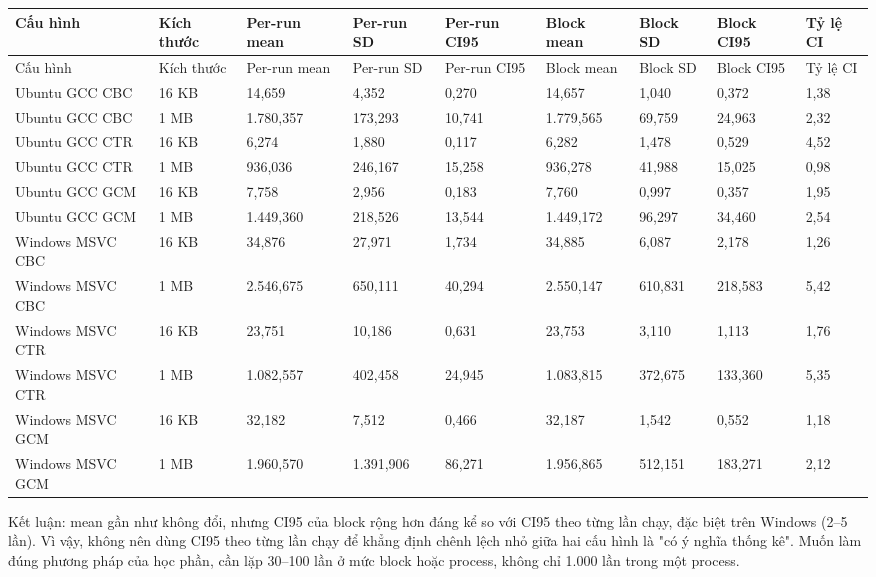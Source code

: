 \documentclass[12pt,a4paper,oneside]{report}
\begin{document}
\begin{longtable}{p{}p{}p{}p{}p{}p{}p{}p{}p{}}
\toprule
Cấu hình & Kích thước & Per-run mean & Per-run SD & Per-run CI95 & Block mean & Block SD & Block CI95 & Tỷ lệ CI \\
\midrule
\endfirsthead
\toprule
Cấu hình & Kích thước & Per-run mean & Per-run SD & Per-run CI95 & Block mean & Block SD & Block CI95 & Tỷ lệ CI \\
\midrule
\endhead
Ubuntu GCC CBC & 16 KB & 14,659 & 4,352 & 0,270 & 14,657 & 1,040 & 0,372 & 1,38 \\
Ubuntu GCC CBC & 1 MB & 1.780,357 & 173,293 & 10,741 & 1.779,565 & 69,759 & 24,963 & 2,32 \\
Ubuntu GCC CTR & 16 KB & 6,274 & 1,880 & 0,117 & 6,282 & 1,478 & 0,529 & 4,52 \\
Ubuntu GCC CTR & 1 MB & 936,036 & 246,167 & 15,258 & 936,278 & 41,988 & 15,025 & 0,98 \\
Ubuntu GCC GCM & 16 KB & 7,758 & 2,956 & 0,183 & 7,760 & 0,997 & 0,357 & 1,95 \\
Ubuntu GCC GCM & 1 MB & 1.449,360 & 218,526 & 13,544 & 1.449,172 & 96,297 & 34,460 & 2,54 \\
Windows MSVC CBC & 16 KB & 34,876 & 27,971 & 1,734 & 34,885 & 6,087 & 2,178 & 1,26 \\
Windows MSVC CBC & 1 MB & 2.546,675 & 650,111 & 40,294 & 2.550,147 & 610,831 & 218,583 & 5,42 \\
Windows MSVC CTR & 16 KB & 23,751 & 10,186 & 0,631 & 23,753 & 3,110 & 1,113 & 1,76 \\
Windows MSVC CTR & 1 MB & 1.082,557 & 402,458 & 24,945 & 1.083,815 & 372,675 & 133,360 & 5,35 \\
Windows MSVC GCM & 16 KB & 32,182 & 7,512 & 0,466 & 32,187 & 1,542 & 0,552 & 1,18 \\
Windows MSVC GCM & 1 MB & 1.960,570 & 1.391,906 & 86,271 & 1.956,865 & 512,151 & 183,271 & 2,12 \\
\bottomrule
\end{longtable}


Kết luận: mean gần như không đổi, nhưng CI95 của block rộng hơn đáng kể so với CI95 theo từng lần chạy, đặc biệt trên Windows (2–5 lần). Vì vậy, không nên dùng CI95 theo từng lần chạy để khẳng định chênh lệch nhỏ giữa hai cấu hình là "có ý nghĩa thống kê". Muốn làm đúng phương pháp của học phần, cần lặp 30–100 lần ở mức block hoặc process, không chỉ 1.000 lần trong một process.
\end{document}
